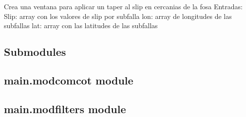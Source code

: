 \documentclass[letterpaper,10pt,english]{sphinxmanual}
\begin{document}
\begin{fulllineitems}
\label{\detokenize{main:main.ventana_taper_slip_fosa}}
\pysigstartsignatures
{}
\pysigstopsignatures
\sphinxAtStartPar
Crea una ventana para aplicar un taper al slip en cercanias de la fosa
Entradas:
Slip: array con los valores de slip por subfalla
lon: array de longitudes de las subfallas
lat: array con las latitudes de las subfallas

\end{fulllineitems}



\subsection{Submodules}
\label{\detokenize{main:submodules}}

\subsection{main.modcomcot module}
\label{\detokenize{main:module-main.modcomcot}}\label{\detokenize{main:main-modcomcot-module}}

\begin{fulllineitems}
\label{\detokenize{main:main.modcomcot.make_multifault}}
\pysigstartsignatures
{}
\pysigstopsignatures
\end{fulllineitems}



\subsection{main.modfilters module}
\label{\detokenize{main:module-main.modfilters}}\label{\detokenize{main:main-modfilters-module}}
\end{document}
